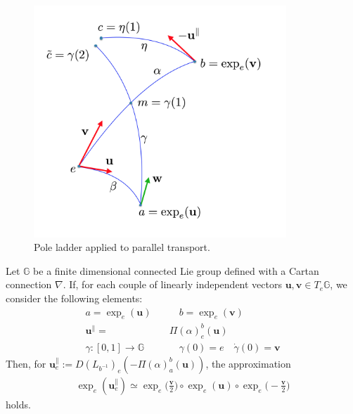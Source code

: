 \begin{figure}[htbp]
	\centering
	\includegraphics[width=9.5cm]{figures/theorem_pict.png}
	\caption{Pole ladder applied to parallel transport.}
	\label{fig:theorem_pict}
\end{figure}

\begin{theorem}\label{th:local_approximation_theorem}
	Let $\mathbb{G}$ be a finite dimensional connected Lie group defined with a Cartan connection $\nabla$. 
	If, for each couple of linearly independent vectors $\mathbf{u}, \mathbf{v} \in T_{e}\mathbb{G}$, we consider the following elements:
	\begin{align*}
	a= \exp_{e}(\mathbf{u}) 
	\quad & \quad  
	b= \exp_{e}(\mathbf{v}) \\
	\mathbf{u}^{\parallel} = & \Pi(\alpha)_{e}^{b}(\mathbf{u})\\
	\gamma : [0,1] \rightarrow \mathbb{G} &\quad \gamma(0) = e \quad \dot{\gamma}(0) = \mathbf{v}
	\end{align*}
	Then, for $\mathbf{u}_{e}^{\parallel} := D(L_{b^{-1}})_{e}( -\Pi(\alpha)_{a}^{b}(\mathbf{u}))$, the approximation
	\begin{align*}
	\exp_{e}(\mathbf{u}_{e}^{\parallel}) 
	\simeq
	\exp_{e}\big(\frac{\mathbf{v}}{2}\big)   
	\circ  \exp_{e}(\mathbf{u}) 
	\circ \exp_{e}\big(-\frac{\mathbf{v}}{2}\big)
	\end{align*}
	holds.
\end{theorem}

